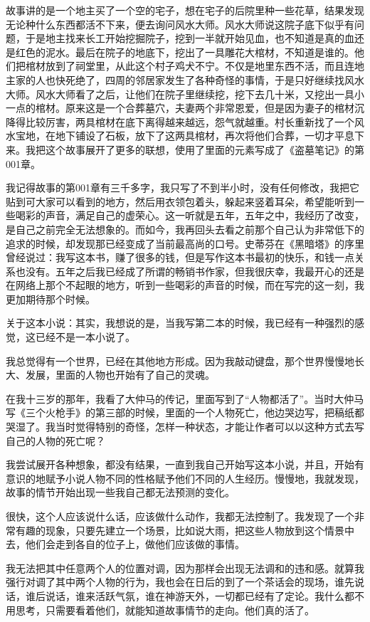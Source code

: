 故事讲的是一个地主买了一个空的宅子，想在宅子的后院里种一些花草，结果发现无论种什么东西都活不下来，便去询问风水大师。风水大师说这院子底下似乎有问题，于是地主找来长工开始挖掘院子，挖到一半就开始见血，也不知道是真的血还是红色的泥水。最后在院子的地底下，挖出了一具雕花大棺材，不知道是谁的。他们把棺材放到了祠堂里，从此这个村子鸡犬不宁。不仅是地里东西不活，而且连地主家的人也快死绝了，四周的邻居家发生了各种奇怪的事情，于是只好继续找风水大师。风水大师看了之后，让他们在院子里继续挖，挖下去几十米，又挖出一具小一点的棺材。原来这是一个合葬墓穴，夫妻两个非常恩爱，但是因为妻子的棺材沉降得比较厉害，两具棺材在底下离得越来越远，怨气就越重。村长重新找了一个风水宝地，在地下铺设了石板，放下了这两具棺材，再次将他们合葬，一切才平息下来。我把这个故事展开了更多的联想，使用了里面的元素写成了《盗墓笔记》的第001章。

我记得故事的第001章有三千多字，我只写了不到半小时，没有任何修改，我把它贴到可大家可以看到的地方，然后用衣领包着头，躲起来竖着耳朵，希望能听到一些喝彩的声音，满足自己的虚荣心。这一听就是五年，五年之中，我经历了改变，是自己之前完全无法想象的。而如今，我再回头去看之前那个自己认为非常低下的追求的时候，却发现那已经变成了当前最高尚的口号。史蒂芬在《黑暗塔》的序里曾经说过：我写这本书，赚了很多的钱，但是写作这本书最初的快乐，和钱一点关系也没有。五年之后我已经成了所谓的畅销书作家，但我很庆幸，我最开心的还是在网络上那个不起眼的地方，听到一些喝彩的声音的时候，而在写完的这一刻，我更加期待那个时候。

关于这本小说：其实，我想说的是，当我写第二本的时候，我已经有一种强烈的感觉，这已经不是一本小说了。

我总觉得有一个世界，已经在其他地方形成。因为我敲动键盘，那个世界慢慢地长大、发展，里面的人物也开始有了自己的灵魂。

在我十三岁的那年，我看了大仲马的传记，里面写到了“人物都活了”。当时大仲马写《三个火枪手》的第三部的时候，里面的一个人物死亡，他边哭边写，把稿纸都哭湿了。我当时觉得特别的奇怪，怎样一种状态，才能让作者可以以这种方式去写自己的人物的死亡呢？

我尝试展开各种想象，都没有结果，一直到我自己开始写这本小说，并且，开始有意识的地赋予小说人物不同的性格赋予他们不同的人生经历。慢慢地，我就发现，故事的情节开始出现一些我自己都无法预测的变化。

很快，这个人应该说什么话，应该做什么动作，我都无法控制了。我发现了一个非常有趣的现象，只要先建立一个场景，比如说大雨，把这些人物放到这个情景中去，他们会走到各自的位子上，做他们应该做的事情。

我无法把其中任意两个人的位置对调，因为那样会出现无法调和的违和感。就算我强行对调了其中两个人物的行为，我也会在日后的到了一个茶话会的现场，谁先说话，谁后说话，谁来活跃气氛，谁在神游天外，一切都已经有了定论。我什么都不用思考，只需要看着他们，就能知道故事情节的走向。他们真的活了。

